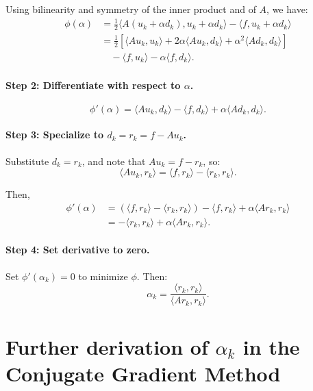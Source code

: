 \documentclass[12pt]{article}
\begin{document}
Using bilinearity and symmetry of the inner product and of \( A \), we have:
\begin{align*}
\phi(\alpha)
&= \frac{1}{2} \langle A(u_k + \alpha d_k), u_k + \alpha d_k \rangle - \langle f, u_k + \alpha d_k \rangle \\
&= \frac{1}{2} \left[ \langle A u_k, u_k \rangle + 2\alpha \langle A u_k, d_k \rangle + \alpha^2 \langle A d_k, d_k \rangle \right] \\
&\quad - \langle f, u_k \rangle - \alpha \langle f, d_k \rangle.
\end{align*}

\paragraph{Step 2: Differentiate with respect to \( \alpha \).}

\[
\phi'(\alpha) = \langle A u_k, d_k \rangle - \langle f, d_k \rangle + \alpha \langle A d_k, d_k \rangle.
\]

\paragraph{Step 3: Specialize to \( d_k = r_k = f - A u_k \).}

Substitute \( d_k = r_k \), and note that \( A u_k = f - r_k \), so:
\[
\langle A u_k, r_k \rangle = \langle f, r_k \rangle - \langle r_k, r_k \rangle.
\]

Then,
\begin{align*}
\phi'(\alpha)
&= \left( \langle f, r_k \rangle - \langle r_k, r_k \rangle \right) - \langle f, r_k \rangle + \alpha \langle A r_k, r_k \rangle \\
&= - \langle r_k, r_k \rangle + \alpha \langle A r_k, r_k \rangle.
\end{align*}

\paragraph{Step 4: Set derivative to zero.}

Set \( \phi'(\alpha_k) = 0 \) to minimize \( \phi \). Then:
\[
\alpha_k = \frac{\langle r_k, r_k \rangle}{\langle A r_k, r_k \rangle}.
\]

\section*{Further derivation of \texorpdfstring{$\alpha_k$}{alpha\_k} in the Conjugate Gradient Method}
\end{document}
